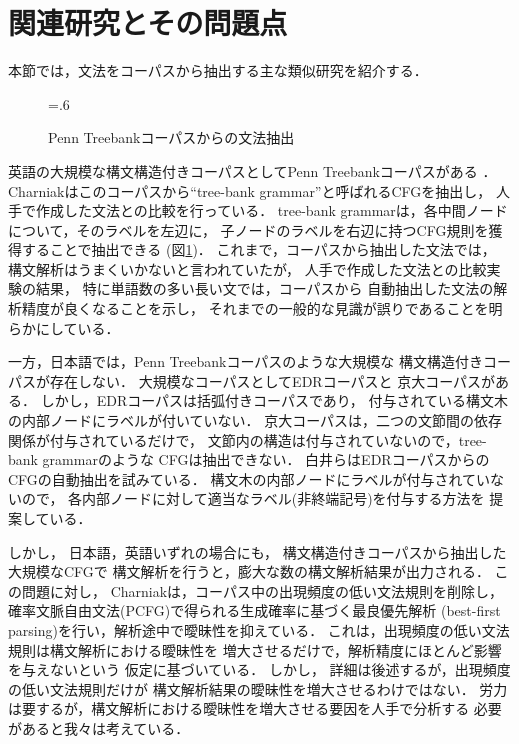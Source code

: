 \section{関連研究とその問題点}
\label{sec:Related}

本節では，文法をコーパスから抽出する主な類似研究を紹介する．

\begin{figure}[tp]
  \centering
  \epsfxsize=.6\textwidth
  \caption{Penn Treebankコーパスからの文法抽出}
  \label{fig:grammar_extraction_from_penntree}
\end{figure}

英語の大規模な構文構造付きコーパスとしてPenn Treebankコーパスがある
\cite{marcus:93}．
Charniakはこのコーパスから``tree-bank grammar''と呼ばれるCFGを抽出し，
人手で作成した文法との比較を行っている\cite{charniak:96}．
tree-bank grammarは，各中間ノードについて，そのラベルを左辺に，
子ノードのラベルを右辺に持つCFG規則を獲得することで抽出できる
(図\ref{fig:grammar_extraction_from_penntree})．
これまで，コーパスから抽出した文法では，
構文解析はうまくいかないと言われていたが，
人手で作成した文法との比較実験の結果，
特に単語数の多い長い文では，コーパスから
自動抽出した文法の解析精度が良くなることを示し，
それまでの一般的な見識が誤りであることを明らかにしている．

一方，日本語では，Penn Treebankコーパスのような大規模な
構文構造付きコーパスが存在しない．
大規模なコーパスとしてEDRコーパス\cite{edr:2001}と
京大コーパス\cite{kurohashi:97}がある．
しかし，EDRコーパスは括弧付きコーパスであり，
付与されている構文木の内部ノードにラベルが付いていない．
京大コーパスは，二つの文節間の依存関係が付与されているだけで，
文節内の構造は付与されていないので，tree-bank grammarのような
CFGは抽出できない．
白井らはEDRコーパスからのCFGの自動抽出を試みている\cite{shirai:97}．
構文木の内部ノードにラベルが付与されていないので，
各内部ノードに対して適当なラベル(非終端記号)を付与する方法を
提案している．

しかし，
日本語，英語いずれの場合にも，
構文構造付きコーパスから抽出した大規模なCFGで
構文解析を行うと，膨大な数の構文解析結果が出力される．
この問題に対し，
Charniakは，コーパス中の出現頻度の低い文法規則を削除し，
確率文脈自由文法(PCFG)で得られる生成確率に基づく最良優先解析
(best-first parsing)を行い，解析途中で曖昧性を抑えている．
これは，出現頻度の低い文法規則は構文解析における曖昧性を
増大させるだけで，解析精度にほとんど影響を与えないという
仮定に基づいている．
しかし，
詳細は後述するが，出現頻度の低い文法規則だけが
構文解析結果の曖昧性を増大させるわけではない．
労力は要するが，構文解析における曖昧性を増大させる要因を人手で分析する
必要があると我々は考えている．

